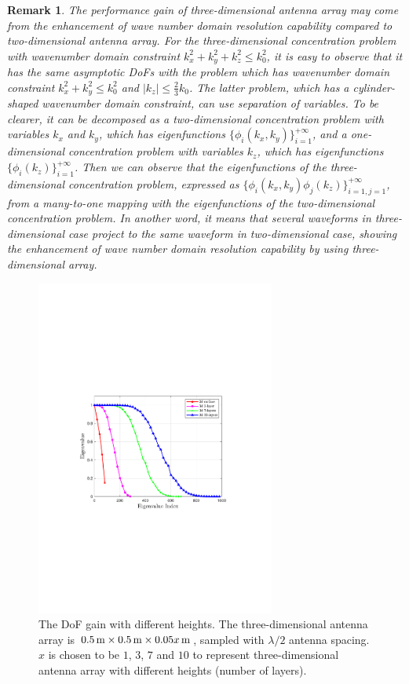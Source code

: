 \documentclass[12pt,draftclsnofoot,journal,onecolumn]{IEEEtran}
\newtheorem{remark}{Remark}
\begin{document}
	\begin{remark}
		The performance gain of three-dimensional antenna array may come from the enhancement of wave number domain resolution capability compared to two-dimensional antenna array. For the three-dimensional concentration problem with wavenumber domain constraint $k_x^2+k_y^2+k_z^2 \leqslant k_0^2$, it is easy to observe that it has the same asymptotic DoFs with the problem which has wavenumber domain constraint $k_x^2+k_y^2 \leqslant k_0^2$ and $|k_z| \leqslant \frac{2}{3}k_0$. The latter problem, which has a cylinder-shaped wavenumber domain constraint, can use separation of variables. To be clearer, it can be decomposed as a two-dimensional concentration problem with variables $k_x$ and $k_y$, which has eigenfunctions $\{\phi_i(k_x,k_y)\}_{i=1}^{+\infty}$, and a one-dimensional concentration problem with variables $k_z$, which has eigenfunctions $\{\phi_i(k_z)\}_{i=1}^{+\infty}$. Then we can observe that the eigenfunctions of the three-dimensional concentration problem, expressed as $\{\phi_i(k_x,k_y)\phi_j(k_z)\}_{i=1,j=1}^{+\infty}$, from a many-to-one mapping with the eigenfunctions of the two-dimensional concentration problem. In another word, it means that several waveforms in three-dimensional case project to the same waveform in two-dimensional case, showing the enhancement of wave number domain resolution capability by using three-dimensional array.
	\end{remark}
	
	\begin{figure}
		\centering 
		\includegraphics[width=0.7\textwidth]{figs/different_z_setting.pdf} 
		\caption{The DoF gain with different heights. The three-dimensional antenna array is $0.5\,{\rm m} \times 0.5\,{\rm m} \times 0.05x\,{\rm m}$, sampled with $\lambda/2$ antenna spacing. $x$ is chosen to be $1$, $3$, $7$ and $10$ to represent three-dimensional antenna array with different heights (number of layers).} 
		\label{different_z_setting}
	\end{figure}
		
\end{document}
